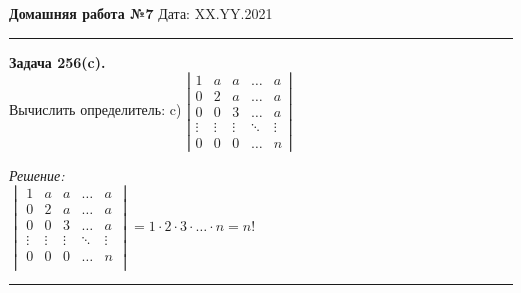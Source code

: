 \documentclass[a4paper, 12pt]{article}
\newenvironment{problem}[2][Задача]
{ \begin{mdframed}[backgroundcolor=gray!10] \textbf{#1 #2.} \\}
	{  \end{mdframed}}
\newenvironment{solution}
{\textit{Решение:}\vspace{.1cm}\\}
{\vspace{.1cm}\noindent\rule{7in}{1.5pt}}
\begin{document}
\noindent
\large\textbf{Домашняя работа №7} \hfill  Дата: XX.YY.2021  \\
\noindent\rule{7in}{2pt}

\begin{problem}{256(c)}
Вычислить определитель:
c) $\left| \begin{array}{ccccc}1 & a & a & \ldots & a\\ 0 & 2 & a & \ldots & a \\ 0 & 0 & 3 & \ldots & a \\ \vdots & \vdots & \vdots & \ddots & \vdots \\ 0 & 0 & 0 & \ldots & n \end{array} \right|$ \\
\end{problem}
\begin{solution}

$
\begin{vmatrix}
	1 & a & a & \ldots & a\\
	0 & 2 & a & \ldots & a \\
	0 & 0 & 3 & \ldots & a \\
	\vdots & \vdots & \vdots & \ddots & \vdots \\
	0 & 0 & 0 & \ldots & n\\
\end{vmatrix} = 1 \cdot 2 \cdot 3 \cdot \ldots \cdot n = n!
$\\

\end{solution} 
\end{document}
